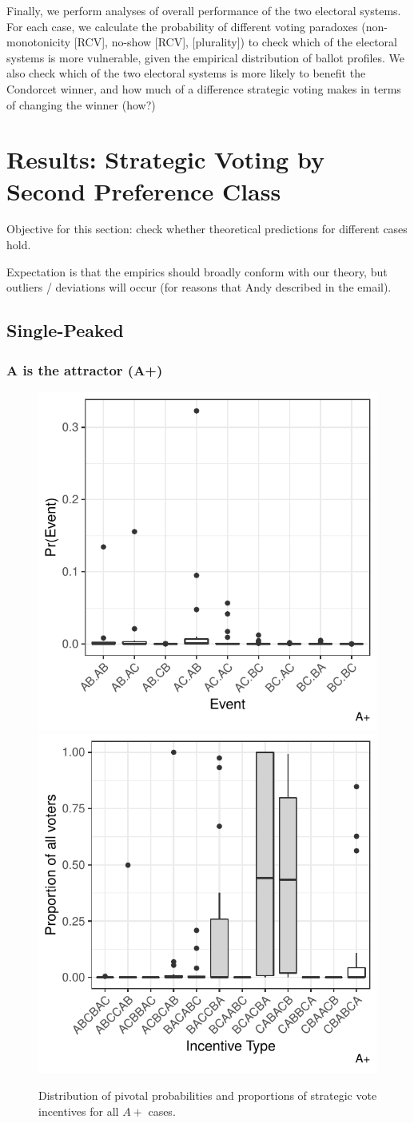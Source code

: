 \documentclass[11pt, letter]{article}
\begin{document}
Finally, we perform analyses of overall performance of the two electoral systems. For each case, we calculate the probability of different voting paradoxes (non-monotonicity [RCV], no-show [RCV], [plurality]) to check which of the electoral systems is more vulnerable, given the empirical distribution of ballot profiles. We also check which of the two electoral systems is more likely to benefit the Condorcet winner, and how much of a difference strategic voting makes in terms of changing the winner (how?)

\section{Results: Strategic Voting by Second Preference Class}

Objective for this section: check whether theoretical predictions for different cases hold.

Expectation is that the empirics should broadly conform with our theory, but outliers / deviations will occur (for reasons that Andy described in the email).

\subsection{Single-Peaked}

\subsubsection{A is the attractor (A+)}

\begin{figure}[!htb]
	\centering
	\includegraphics[width = .45\textwidth]{../output/figures/prediction/pprob_sp_a.pdf}
	\includegraphics[width = .45\textwidth]{../output/figures/prediction/svinc_sp_a.pdf}
	\caption{Distribution of pivotal probabilities and proportions of strategic vote incentives for all $A+$ cases.}
	\label{fig:figure1}
\end{figure}
\end{document}
